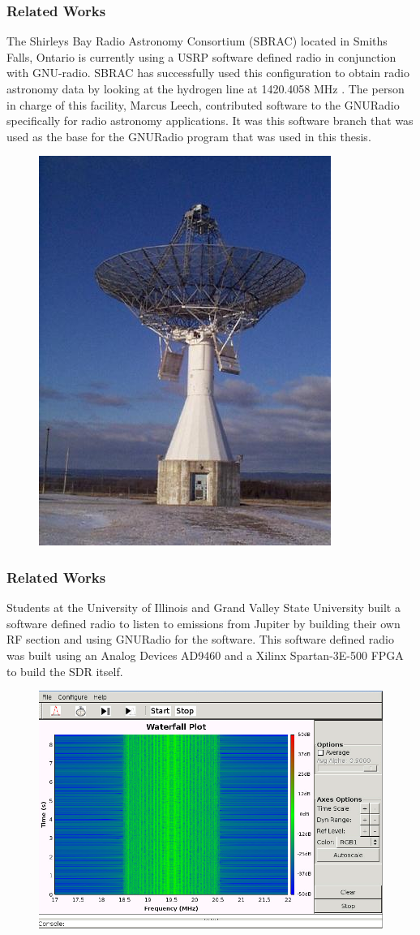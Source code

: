 \documentclass{beamer}
\begin{document}
\begin{frame}
\frametitle{Related Works}

The Shirleys Bay Radio Astronomy Consortium (SBRAC) located in Smiths Falls, Ontario is currently using a USRP software defined radio in conjunction with GNU-radio.  SBRAC has successfully used this configuration to obtain radio astronomy data by looking at the hydrogen line at 1420.4058 MHz \cite{Leech2007}.  The person in charge of this facility, Marcus Leech, contributed software to the GNURadio specifically for radio astronomy applications.  It was this software branch that was used as the base for the GNURadio program that was used in this thesis.

\begin{figure}\label{sbrac}
\includegraphics[width=0.2\linewidth]{images/ra.jpg}
\end{figure}

\end{frame}
\begin{frame}
\frametitle{Related Works}

Students at the University of Illinois and Grand Valley State University built a software defined radio to listen to emissions from Jupiter\cite{Behnke} by building their own RF section and using GNURadio for the software.  This software defined radio was built using an Analog Devices AD9460 and a Xilinx Spartan-3E-500 FPGA to build the SDR itself.

\begin{figure}\label{behnke}
\includegraphics[width=0.5\linewidth]{images/behnke_GUI.png}
\end{figure}
\end{frame}
\end{document}
